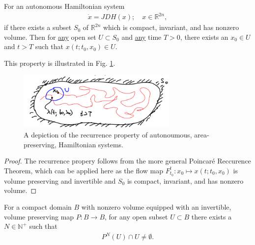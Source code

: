 \begin{proposition}[Recurrence]
	For an autonomous Hamiltonian system
	\begin{align}
		\dot{x}= JDH(x);\quad x \in \mathbb{R}^{2n},
	\end{align}
	if there exists a subset $S_0$ of $\mathbb{R}^{2n}$ which is compact, invariant, and has nonzero volume. Then for \underline{any} open set $U\subset S_0$ and \underline{any} time $T>0$, there exists an $x_0 \in U$ and $t>T$ such that $x(t;t_0, x_0)\in U$.	
\end{proposition}
This property is illustrated in Fig. \ref{fig:hamiltonian_recurrence}.
\begin{figure}[h!]
	\centering
	\includegraphics[width=0.7\textwidth]{figures/ch8/11hamiltonian_recurrence.png}
	\caption{A depiction of the recurrence property of autonoumous, area-preserving, Hamiltonian systems.}
	\label{fig:hamiltonian_recurrence}
\end{figure}
\begin{proof}
	The recurrence propery follows from the more general Poincaré Reccurence Theorem, which can be applied here as the flow map $F_{t_0}^{t}:x_0 \mapsto x(t;t_0, x_0)$ is volume preserving and invertible and $S_0$ is compact, invariant, and has nonzero volume.
\end{proof}
\begin{proposition}
	For a compact domain $B$ with nonzero volume equipped with an invertible, volume preserving map $P:B\to B$, for any open subset $U\subset B$ there exists a $N \in \mathbb{N}^{+}$ such that
	\begin{align}
		\boxed{P^{N}(U) \cap U \neq \emptyset.}
	\end{align}
\end{proposition}
